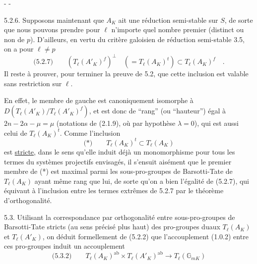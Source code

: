 \begin{center}-  -\end{center}

5.2.6. Supposons maintenant que $A_K$ ait une réduction semi-stable sur $S$, de sorte que nous pouvons prendre pour $\ell$ n'importe quel nombre premier (distinct ou non de $p$). D'ailleurs, en vertu du critère galoisien de réduction semi-stable 3.5, on a pour $\ell\neq p$
\[
\text{(5.2.7)}\qquad (T_\ell(A'_K)^f)^\perp\quad (=T_\ell(A_K)^t)\subset T_\ell(A_K)^f\quad .
\]
Il reste à prouver, pour terminer la preuve de 5.2, que cette inclusion est valable sans restriction sur $\ell$.

En effet, le membre de gauche est canoniquement isomorphe à $D(T_\ell(A'_K)/T_\ell(A'_K)^f)$, et est donc de ``rang'' (ou ``hauteur'') égal à $2n-2\alpha-\mu=\mu$ (notations de (2.1.9), où par hypothèse $\lambda=0$), qui est aussi celui de $T_\ell(A_K)^t$. Comme l'inclusion
\[
\text{(*)}\qquad T_\ell(A_K)^t\subset T_\ell(A_K)
\]
est \uline{stricte}, dans le sens qu'elle induit déjà un monomorphisme pour tous les termes du systèmes projectifs envisagés, il s'ensuit aisément que le premier membre de (*) est maximal parmi les sous-pro-groupes de Barsotti-Tate de $T_\ell(A_K)$ ayant même rang que lui, de sorte qu'on a bien l'égalité de (5.2.7), qui équivaut à l'inclusion entre les termes extrêmes de 5.2.7 par le théorème d'orthogonalité.

5.3. Utilisant la correspondance par orthogonalité entre sous-pro-groupes de Barsotti-Tate stricts (au sens précisé plus haut) des pro-groupes duaux $T_\ell(A_K)$ et $T_\ell(A'_K)$, on déduit formellement de (5.2.2) que l'accouplement (1.0.2) entre ces pro-groupes induit un accouplement
\[
\text{(5.3.2)}\qquad T_\ell(A_K)^{\mathrm{ab}}\times T_\ell(A'_K)^{\mathrm{ab}}\longrightarrow T_\ell(\mathbb G_{mK})
\]

